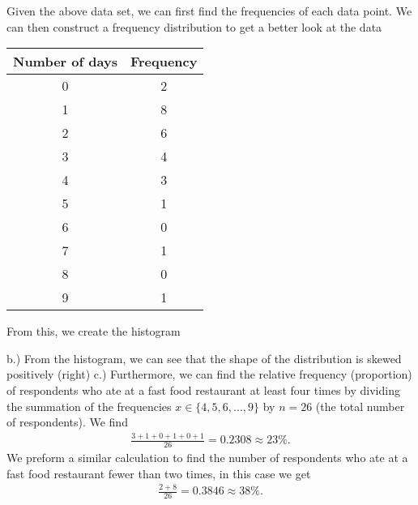 \documentclass{report}
\begin{document}
    \bigbreak \noindent 
    Given the above data set, we can first find the frequencies of each data point. We can then construct a frequency distribution to get a better look at the data
    \bigbreak \noindent 
    \begin{center}
        \begin{tabular}{c|c}
            Number of days &  Frequency \\
            \hline
            0 & 2 \\
            1 & 8\\
            2 & 6 \\
            3 & 4\\
            4 & 3\\
            5 & 1\\
            6 & 0\\
            7 & 1\\
            8 & 0\\ 
            9 & 1
        \end{tabular}
    \end{center}
    \bigbreak \noindent 
    \pagebreak \bigbreak \noindent 
    From this, we create the histogram
    \bigbreak \noindent 
\begin{figure}[ht]
    \centering
    \label{fig:histo22}
\end{figure}

\bigbreak \noindent 
b.) From the histogram, we can see that the shape of the distribution is skewed positively (right)
\bigbreak \noindent 
c.) Furthermore, we can find the relative frequency (proportion) of respondents who ate at a fast food restaurant at least four times by dividing the summation of the frequencies $x\in\{4,5,6,...,9\} $ by $n=26 $ (the total number of respondents). We find
\begin{align*}
    \frac{3 + 1 + 0 + 1 + 0 + 1}{26}  = 0.2308 \approx  23\%
.\end{align*}
\bigbreak \noindent 
We preform a similar calculation to find the number of respondents who ate at a fast food restaurant fewer than two times, in this case we get
\begin{align*}
    \frac{2 + 8}{26} =  0.3846 \approx 38\%
.\end{align*}
\end{document}
